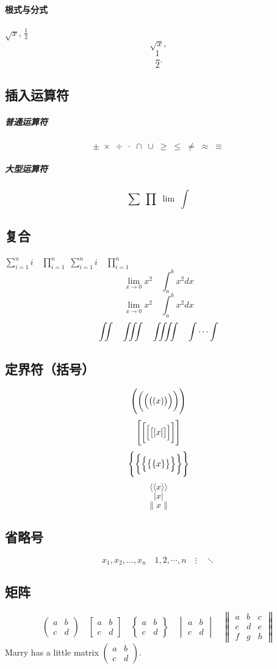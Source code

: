 \documentclass[UTF8]{ctexart}
\begin{document}
\paragraph{根式与分式}
$\sqrt{x}$, $\tfrac{1}{2}$
\[\sqrt{x},\]
\[\frac{1}{2}.\]

\subsection{插入运算符}
\subparagraph{普通运算符}
\[\pm \; \times \; \div \; \cdot \; \cap \; \cup \;
\geq \; \leq \; \neq \; \approx \; \equiv \]
\subparagraph{大型运算符}
\[\sum \; \prod \; \lim \; \int \]

\subsection{复合}
$ \sum_{i=1}^n i\quad \prod_{i=1}^n $
$ \sum\limits _{i=1}^n i\quad \prod\limits _{i=1}^n $
\[ \lim_{x\to0}x^2 \quad \int_a^b x^2 dx \]
\[ \lim _{x\to0}x^2 \quad \int\nolimits_a^b x^2 dx \]
\[ \iint\quad \iiint\quad \iiiint\quad \idotsint \]

\subsection{定界符（括号）}
\[ \Biggl( \biggl( \Bigl( \bigl( (x) \bigr) \Bigr) \biggr) \Biggr) \]
\[ \Biggl[ \biggl[ \Bigl[ \bigl[ [x] \bigr] \Bigr] \biggr] \Biggr] \]
\[ \Biggl\{ \biggl\{ \Bigl\{ \bigl\{ \{x\} \bigr\} \Bigr\} \biggr\} \Biggr\} \]
\[ \Biggl\langle \langle x \rangle \Biggr \rangle \]
\[ \Biggl\lvert x \Biggr\rvert \]
\[ \Biggl\lVert x \Biggr\rVert \]

\subsection{省略号}
\[ x_1, x_2, \dots , x_n\quad 1, 2, \cdots ,n\quad \vdots\quad \ddots \]

\subsection{矩阵}
\[ \begin{pmatrix} a&b\\c&d \end{pmatrix} \quad
\begin{bmatrix} a&b\\c&d \end{bmatrix} \quad
\begin{Bmatrix} a&b\\c&d \end{Bmatrix} \quad
\begin{vmatrix} a&b\\c&d \end{vmatrix} \quad
\begin{Vmatrix} a&b&c\\c&d&e\\f&g&h \end{Vmatrix} \]
Marry has a little matrix $ (\begin{smallmatrix} a&b\\c&d \end{smallmatrix} ) $.
\end{document}
